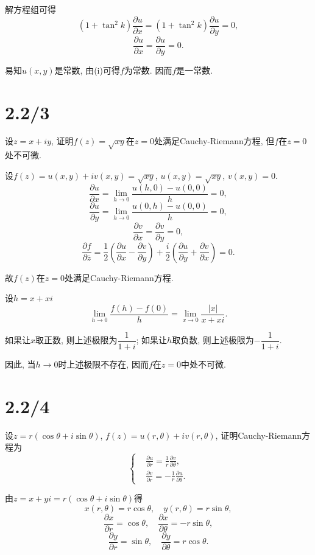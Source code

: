\documentclass[11pt,a4paper]{article}
\begin{document}
解方程组可得
$$(1+\tan^2k)\frac{\partial u}{\partial x}=(1+\tan^2k)\frac{\partial u}{\partial y}=0,$$
$$\frac{\partial u}{\partial x}=\frac{\partial u}{\partial y}=0.$$

易知$u(x,y)$是常数, 由(i)可得$f$为常数. 因而$f$是一常数.

\section{2.2/3}
\begin{problem}
  设$z=x+iy$, 证明$f(z)=\sqrt{xy}$在$z=0$处满足Cauchy-Riemann方程, 但$f$在$z=0$处不可微.
\end{problem}

设$f(z)=u(x,y)+iv(x,y)=\sqrt{xy}$, $u(x,y)=\sqrt{xy}$, $v(x,y)=0$.
$$\frac{\partial u}{\partial x}=\lim_{h\to0}\frac{u(h,0)-u(0,0)}{h}=0,$$
$$\frac{\partial u}{\partial y}=\lim_{h\to0}\frac{u(0,h)-u(0,0)}{h}=0,$$
$$\frac{\partial v}{\partial x}=\frac{\partial v}{\partial y}=0,$$
$$\frac{\partial f}{\partial\bar{z}}=\frac{1}{2}\left(\frac{\partial u}{\partial x}-\frac{\partial v}{\partial y}\right)+\frac{i}{2}\left(\frac{\partial u}{\partial y}+\frac{\partial v}{\partial x}\right)=0.$$

故$f(z)$在$z=0$处满足Cauchy-Riemann方程.

设$h=x+xi$
$$\lim_{h\to0}\frac{f(h)-f(0)}{h}=\lim_{x\to0}\frac{|x|}{x+xi}.$$

如果让$x$取正数, 则上述极限为$\dfrac{1}{1+i}$; 如果让$h$取负数, 则上述极限为$-\dfrac{1}{1+i}$.

因此, 当$h\to0$时上述极限不存在, 因而$f$在$z=0$中处不可微.

\section{2.2/4}
\begin{problem}
  设$z=r(\cos\theta+i\sin\theta)$, $f(z)=u(r,\theta)+iv(r,\theta)$, 证明Cauchy-Riemann方程为
  $$\left\{\begin{aligned}
    &\frac{\partial u}{\partial r}=\frac{1}{r}\frac{\partial v}{\partial\theta},\\
    &\frac{\partial v}{\partial r}=-\frac{1}{r}\frac{\partial u}{\partial\theta}.
  \end{aligned}\right.$$
\end{problem}

由$z=x+yi=r(\cos\theta+i\sin\theta)$得
$$x(r,\theta)=r\cos\theta,\quad y(r,\theta)=r\sin\theta,$$
$$\frac{\partial x}{\partial r}=\cos\theta,\quad \frac{\partial x}{\partial \theta}=-r\sin\theta,$$
$$\frac{\partial y}{\partial r}=\sin\theta,\quad \frac{\partial y}{\partial \theta}=r\cos\theta.$$
\end{document}

